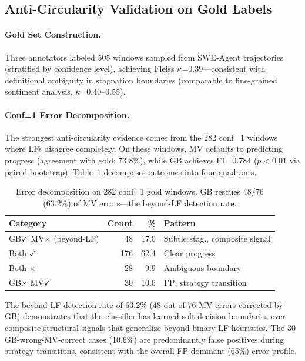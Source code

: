 \documentclass[11pt,a4paper]{article}
\begin{document}
\subsection{Anti-Circularity Validation on Gold Labels}
\label{sec:gold}

\paragraph{Gold Set Construction.}
Three annotators labeled 505 windows sampled from SWE-Agent trajectories (stratified by confidence level), achieving Fleiss $\kappa$=0.39---consistent with definitional ambiguity in stagnation boundaries (comparable to fine-grained sentiment analysis, $\kappa$=0.40--0.55).

\paragraph{Conf=1 Error Decomposition.}
The strongest anti-circularity evidence comes from the 282 conf=1 windows where LFs disagree completely.
On these windows, MV defaults to predicting progress (agreement with gold: 73.8\%), while GB achieves F1=0.784 ($p<0.01$ via paired bootstrap).
Table~\ref{tab:conf1_decomp} decomposes outcomes into four quadrants.

\begin{table}[t]
\centering
\small
\begin{tabular}{lrrl}
\toprule
\textbf{Category} & \textbf{Count} & \textbf{\%} & \textbf{Pattern} \\
\midrule
GB$\checkmark$ MV$\times$ (beyond-LF) & 48 & 17.0 & Subtle stag., composite signal \\
Both $\checkmark$ & 176 & 62.4 & Clear progress \\
Both $\times$ & 28 & 9.9 & Ambiguous boundary \\
GB$\times$ MV$\checkmark$ & 30 & 10.6 & FP: strategy transition \\
\bottomrule
\end{tabular}
\caption{Error decomposition on 282 conf=1 gold windows. GB rescues 48/76 (63.2\%) of MV errors---the beyond-LF detection rate.}
\label{tab:conf1_decomp}
\end{table}

The beyond-LF detection rate of 63.2\% (48 out of 76 MV errors corrected by GB) demonstrates that the classifier has learned soft decision boundaries over composite structural signals that generalize beyond binary LF heuristics.
The 30 GB-wrong-MV-correct cases (10.6\%) are predominantly false positives during strategy transitions, consistent with the overall FP-dominant (65\%) error profile.
\end{document}
